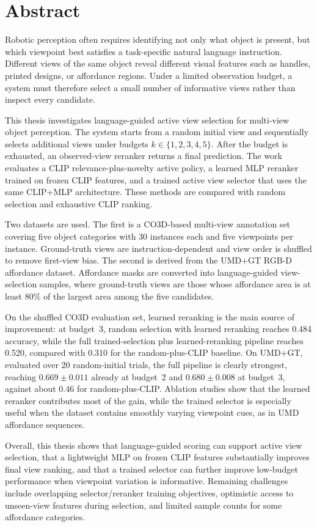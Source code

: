 \chapter*{Abstract}\label{abstract}
Robotic perception often requires identifying not only what object is present, but which viewpoint best satisfies a task-specific natural language instruction. Different views of the same object reveal different visual features such as handles, printed designs, or affordance regions. Under a limited observation budget, a system must therefore select a small number of informative views rather than inspect every candidate.

This thesis investigates language-guided active view selection for multi-view object perception. The system starts from a random initial view and sequentially selects additional views under budgets \(k \in \{1,2,3,4,5\}\). After the budget is exhausted, an observed-view reranker returns a final prediction. The work evaluates a CLIP relevance-plus-novelty active policy, a learned MLP reranker trained on frozen CLIP features, and a trained active view selector that uses the same CLIP+MLP architecture. These methods are compared with random selection and exhaustive CLIP ranking.

Two datasets are used. The first is a CO3D-based multi-view annotation set covering five object categories with 30 instances each and five viewpoints per instance. Ground-truth views are instruction-dependent and view order is shuffled to remove first-view bias. The second is derived from the UMD+GT RGB-D affordance dataset. Affordance masks are converted into language-guided view-selection samples, where ground-truth views are those whose affordance area is at least 80\% of the largest area among the five candidates.

On the shuffled CO3D evaluation set, learned reranking is the main source of improvement: at budget~3, random selection with learned reranking reaches 0.484 accuracy, while the full trained-selection plus learned-reranking pipeline reaches 0.520, compared with 0.310 for the random-plus-CLIP baseline. On UMD+GT, evaluated over 20 random-initial trials, the full pipeline is clearly strongest, reaching \(0.669\pm0.011\) already at budget~2 and \(0.680\pm0.008\) at budget~3, against about 0.46 for random-plus-CLIP. Ablation studies show that the learned reranker contributes most of the gain, while the trained selector is especially useful when the dataset contains smoothly varying viewpoint cues, as in UMD affordance sequences.

Overall, this thesis shows that language-guided scoring can support active view selection, that a lightweight MLP on frozen CLIP features substantially improves final view ranking, and that a trained selector can further improve low-budget performance when viewpoint variation is informative. Remaining challenges include overlapping selector/reranker training objectives, optimistic access to unseen-view features during selection, and limited sample counts for some affordance categories.
